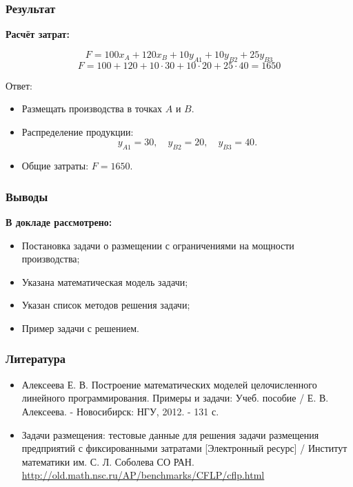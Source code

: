 \documentclass[12pt]{beamer}
\begin{document}
    \begin{frame}
        \frametitle{Результат}
    
        \textbf{Расчёт затрат:}

        $$F = 100x_A + 120x_B + 10y_{A1} + 10y_{B2} + 25y_{B3}$$
        $$F = 100 + 120 + 10 \cdot 30 + 10 \cdot 20 + 25 \cdot 40 = 1650$$

        \begin{block}{Ответ:}
            \begin{itemize}
                \item Размещать производства в точках \( A \) и \( B \).
                \item Распределение продукции:
                \[
                y_{A1} = 30, \quad y_{B2} = 20, \quad y_{B3} = 40.
                \]
                \item Общие затраты: \( F = 1650 \).
            \end{itemize}    
        \end{block}

    \end{frame}

    \begin{frame}
        \frametitle{Выводы}
    
        \textbf{В докладе рассмотрено:}

        \begin{itemize}
            \item Постановка задачи о размещении с ограничениями на мощности производства;
            \item Указана математическая модель задачи;
            \item Указан список методов решения задачи;
            \item Пример задачи с решением.
        \end{itemize}
    
    \end{frame}

    \begin{frame}
        \frametitle{Литература}

        \vspace{-1cm}

        \begin{itemize}
            \item Алексеева Е. В. Построение математических моделей целочисленного линейного программирования. Примеры и задачи: Учеб. пособие / Е. В. Алексеева. - Новосибирск: НГУ, 2012. - 131 с.
            \item Задачи размещения: тестовые данные для решения задачи размещения предприятий с фиксированными затратами [Электронный ресурс] / Институт математики им. С. Л. Соболева СО РАН. \url{http://old.math.nsc.ru/AP/benchmarks/CFLP/cflp.html}
        \end{itemize}

    \end{frame}
	
\end{document}
